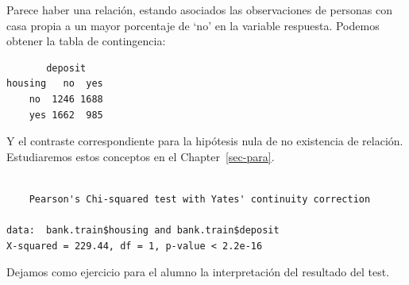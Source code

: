 \documentclass[
  letterpaper,
  DIV=11,
  numbers=noendperiod]{scrreprt}
\newenvironment{Shaded}{\begin{snugshade}}{\end{snugshade}}
\newcommand{\AttributeTok}[1]{\textcolor[rgb]{0.40,0.45,0.13}{#1}}
\newcommand{\FunctionTok}[1]{\textcolor[rgb]{0.28,0.35,0.67}{#1}}
\newcommand{\NormalTok}[1]{\textcolor[rgb]{0.00,0.23,0.31}{#1}}
\newcommand{\OtherTok}[1]{\textcolor[rgb]{0.00,0.23,0.31}{#1}}
\newcommand{\SpecialCharTok}[1]{\textcolor[rgb]{0.37,0.37,0.37}{#1}}
\newcommand{\StringTok}[1]{\textcolor[rgb]{0.13,0.47,0.30}{#1}}
\begin{document}
Parece haber una relación, estando asociados las observaciones de
personas con casa propia a un mayor porcentaje de `no' en la variable
respuesta. Podemos obtener la tabla de contingencia:

\begin{Shaded}
\end{Shaded}

\begin{verbatim}
       deposit
housing   no  yes
    no  1246 1688
    yes 1662  985
\end{verbatim}

Y el contraste correspondiente para la hipótesis nula de no existencia
de relación. Estudiaremos estos conceptos en el Chapter~\ref{sec-para}.

\begin{Shaded}
\end{Shaded}

\begin{verbatim}

    Pearson's Chi-squared test with Yates' continuity correction

data:  bank.train$housing and bank.train$deposit
X-squared = 229.44, df = 1, p-value < 2.2e-16
\end{verbatim}

\begin{tcolorbox}[enhanced jigsaw, arc=.35mm, breakable, coltitle=black, left=2mm, opacityback=0, bottomtitle=1mm, colbacktitle=quarto-callout-caution-color!10!white, title=\textcolor{quarto-callout-caution-color}{\faFire}\hspace{0.5em}{Ejercicio}, titlerule=0mm, colback=white, colframe=quarto-callout-caution-color-frame, bottomrule=.15mm, rightrule=.15mm, opacitybacktitle=0.6, toptitle=1mm, toprule=.15mm, leftrule=.75mm]

Dejamos como ejercicio para el alumno la interpretación del resultado
del test.

\end{tcolorbox}
\end{document}

